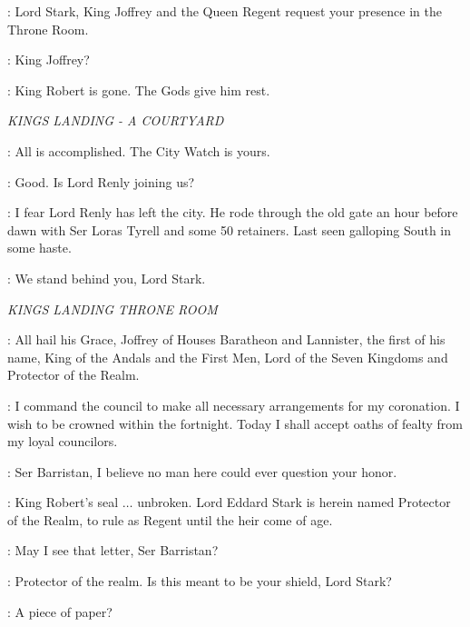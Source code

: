 \PAGE: Lord Stark, King Joffrey and the Queen Regent request your presence in the Throne Room. 

\NED: King Joffrey? 

\PAGE: King Robert is gone. The Gods give him rest. 


\scene

\textit{KINGS LANDING - A COURTYARD} 


\LITTLEFINGER: All is accomplished. The City Watch is yours. 

\NED: Good. Is Lord Renly joining us? 

\VARYS: I fear Lord Renly has left the city. He rode through the old gate an hour before dawn with Ser Loras Tyrell and some 50 retainers. Last seen galloping South in some haste. 

\GOLDCLOAK: We stand behind you, Lord Stark. 



\scene

\textit{KINGS LANDING THRONE ROOM} 


\PAGE:  All hail his Grace, Joffrey of Houses Baratheon and Lannister, the first of his name, King of the Andals and the First Men, Lord of the Seven Kingdoms and Protector of the Realm. 

\JOFFREY: I command the council to make all necessary arrangements for my coronation. I wish to be crowned within the fortnight. Today I shall accept oaths of fealty from my loyal councilors. 

\NED: Ser Barristan, I believe no man here could ever question your honor. 


\SELMY: King Robert's seal $\ldots$ unbroken. Lord Eddard Stark is herein named Protector of the Realm, to rule as Regent until the heir come of age. 

\CERSEI: May I see that letter, Ser Barristan?


\CERSEI: Protector of the realm. Is this meant to be your shield, Lord Stark? 

\CERSEI:  A piece of paper? 

